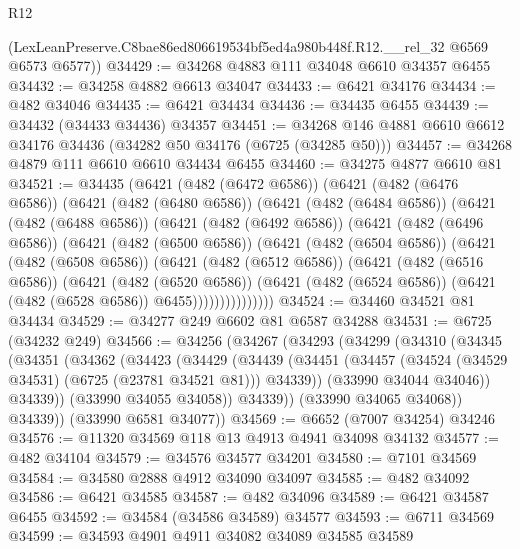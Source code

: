 \begin{lexlean}{R12}
\begin{coremodule}
      (LexLeanPreserve.C8bae86ed806619534bf5ed4a980b448f.R12.__rel_32 @6569 @6573 @6577))
@34429 := @34268 @4883 @111 @34048 @6610 @34357 @6455
@34432 := @34258 @4882 @6613 @34047
@34433 := @6421 @34176
@34434 := @482 @34046
@34435 := @6421 @34434
@34436 := @34435 @6455
@34439 := @34432 (@34433 @34436) @34357
@34451 := @34268 @146 @4881 @6610 @6612 @34176 @34436 (@34282 @50 @34176 (@6725 (@34285 @50)))
@34457 := @34268 @4879 @111 @6610 @6610 @34434 @6455
@34460 := @34275 @4877 @6610 @81
@34521 := @34435
    (@6421
      (@482 (@6472 @6586))
      (@6421
        (@482 (@6476 @6586))
        (@6421
          (@482 (@6480 @6586))
          (@6421
            (@482 (@6484 @6586))
            (@6421
              (@482 (@6488 @6586))
              (@6421
                (@482 (@6492 @6586))
                (@6421
                  (@482 (@6496 @6586))
                  (@6421
                    (@482 (@6500 @6586))
                    (@6421
                      (@482 (@6504 @6586))
                      (@6421
                        (@482 (@6508 @6586))
                        (@6421
                          (@482 (@6512 @6586))
                          (@6421
                            (@482 (@6516 @6586))
                            (@6421
                              (@482 (@6520 @6586))
                              (@6421
                                (@482 (@6524 @6586))
                                (@6421 (@482 (@6528 @6586)) @6455)))))))))))))))
@34524 := @34460 @34521 @81 @34434
@34529 := @34277 @249 @6602 @81 @6587 @34288
@34531 := @6725 (@34232 @249)
@34566 := @34256
    (@34267
      (@34293
        (@34299
          (@34310
            (@34345
              (@34351
                (@34362
                  (@34423
                    (@34429
                      (@34439
                        (@34451
                          (@34457 (@34524 (@34529 @34531) (@6725 (@23781 @34521 @81))) @34339))
                        (@33990 @34044 @34046))
                      @34339))
                  (@33990 @34055 @34058))
                @34339))
            (@33990 @34065 @34068))
          @34339))
      (@33990 @6581 @34077))
@34569 := @6652 (@7007 @34254) @34246
@34576 := @11320 @34569 @118 @13 @4913 @4941 @34098 @34132
@34577 := @482 @34104
@34579 := @34576 @34577 @34201
@34580 := @7101 @34569
@34584 := @34580 @2888 @4912 @34090 @34097
@34585 := @482 @34092
@34586 := @6421 @34585
@34587 := @482 @34096
@34589 := @6421 @34587 @6455
@34592 := @34584 (@34586 @34589) @34577
@34593 := @6711 @34569
@34599 := @34593 @4901 @4911 @34082 @34089 @34585 @34589

\end{coremodule}
\end{lexlean}
